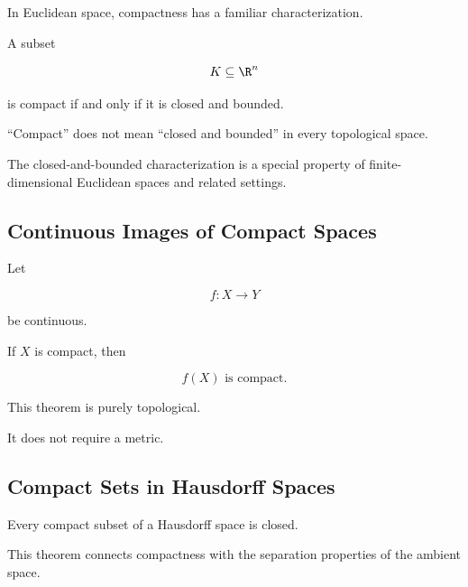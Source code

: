 In Euclidean space, compactness has a familiar characterization.

\begin{theorem}
A subset

\[
K\subseteq\R^n
\]

is compact if and only if it is closed and bounded.
\end{theorem}

\begin{warningbox}
``Compact'' does not mean ``closed and bounded'' in every topological space.

The closed-and-bounded characterization is a special property of
finite-dimensional Euclidean spaces and related settings.
\end{warningbox}

\subsection{Continuous Images of Compact Spaces}
\label{subsec:continuous-image-compact}

\begin{theorem}
Let

\[
f:X\to Y
\]

be continuous.

If \(X\) is compact, then

\[
\boxed{
f(X)
\text{ is compact}.
}
\]
\end{theorem}

This theorem is purely topological.

It does not require a metric.

\subsection{Compact Sets in Hausdorff Spaces}
\label{subsec:compact-hausdorff}

\begin{theorem}
Every compact subset of a Hausdorff space is closed.
\end{theorem}

This theorem connects compactness with the separation properties of the
ambient space.

